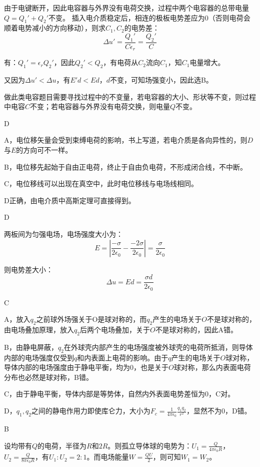\documentclass[b5paper,opensource,sourcefont,parskip]{qyxf-book}
\begin{document}
由于电键断开，因此电容器与外界没有电荷交换，过程中两个电容器的总带电量$ Q=Q_1'+Q_2' $不变。
插入电介质稳定后，相连的极板电势差应为$ 0 $（否则电荷会顺着电势减小的方向移动），则求$ C_1,C_2 $的电势差：
\[\Delta u'=\frac{Q_1'}{C\epsilon_r}=\frac{Q_2'}{C}\]

有：$Q_1'=\epsilon_r Q_2'$，因此$Q_2'<Q_2$，有电荷从$C_2$流向$C_1$，知$C_1$电量增大。

又因为$\Delta u'<\Delta u$，有$E'd<Ed$，$d$不变，可知场强变小，因此选B。

\note 做此类电容题目需要寻找过程中的不变量，若电容器的大小、形状等不变，则过程中电容$ C $不变；若电容器与外界没有电荷交换，则电量$ Q $不变。

D

\solve A，电位移矢量会受到束缚电荷的影响，书上写道，若电介质是各向异性的，则$ D $与$ E $的方向可不一样。

B，电位移先起始于自由正电荷，终止于自由负电荷，不形成闭合线，不中断。

C，电位移线可以出现在真空中，此时电位移线与电场线相同。

D正确，由电介质中高斯定理可直接得到。

D

\solve 两板间为匀强电场，电场强度大小为：
\[E=\left|\frac{-\sigma}{2\epsilon_0}-\frac{-2\sigma}{2\epsilon_0}\right|=\frac{\sigma}{2\epsilon_0}\]

则电势差大小：
\[\Delta u=Ed=\frac{\sigma d}{2\epsilon_0}\]

C

\solve A，放入$q_2$之前球外场强关于O是球对称的，而$q_2$产生的电场关于$O$不是球对称的，由电场叠加原理，放入$q_2$后两个电场叠加，关于$O$不是球对称的，因此A错。

B，由静电屏蔽，$q_2$在外球壳内部产生的电场强度被外球壳的电荷所抵消，则导体内部的电场强度仅受到$q$和内表面上电荷的影响。由于$q$产生的电场关于$O$球对称，导体内部的电场强度由于静电平衡，均为$0$，也是关于$O$球对称，那么内表面电荷分布也必然是球对称，B错。

C，由于静电平衡，导体内部是等势体，自然内外表面电势差恒为$0$，C对。

D，$ q_1,q_2 $之间的静电作用力即使库仑力，大小为$ F_c=\frac{1}{4\pi\epsilon_0}\frac{q_1q_2}{r^2} $，显然不为0，D错。

B

\solve 设均带有$ Q $的电荷，半径为$ R $和$ 2R $。则孤立导体球的电势为：$U_1=\frac{Q}{4\pi\epsilon_0R} $，$ U_2=\frac{Q}{8\pi\epsilon_0R} $，有$ U_1:U_2=2:1 $。而电场能量$ W=\frac{QU}{2} $，则可知$ W_1=W_2 $。
\end{document}
